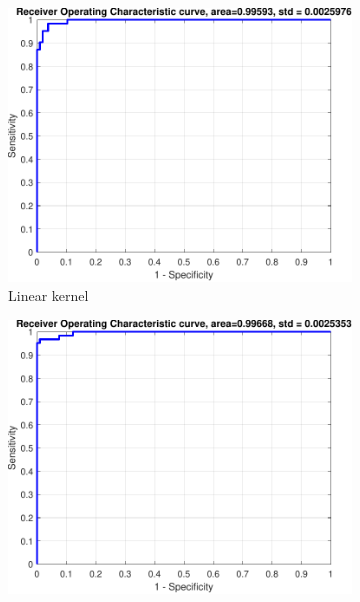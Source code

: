 \documentclass{article}
\begin{document}
        \begin{figure}[H]
             \centering
             
             \begin{subfigure}[b]{0.3\textwidth}
                 \centering
                 \includegraphics[width=\textwidth]{Assignment 1/figures/breast_linear_classifier_roc.pdf}
                \caption{Linear kernel}
                 \label{fig:breast_liner_roc}
             \end{subfigure}
             \hfill
             \begin{subfigure}[b]{0.3\textwidth}
                 \centering
                 \includegraphics[width=\textwidth]{Assignment 1/figures/breast_rbf_classifier_roc.pdf}

\end{subfigure}
\end{figure}
\end{document}
